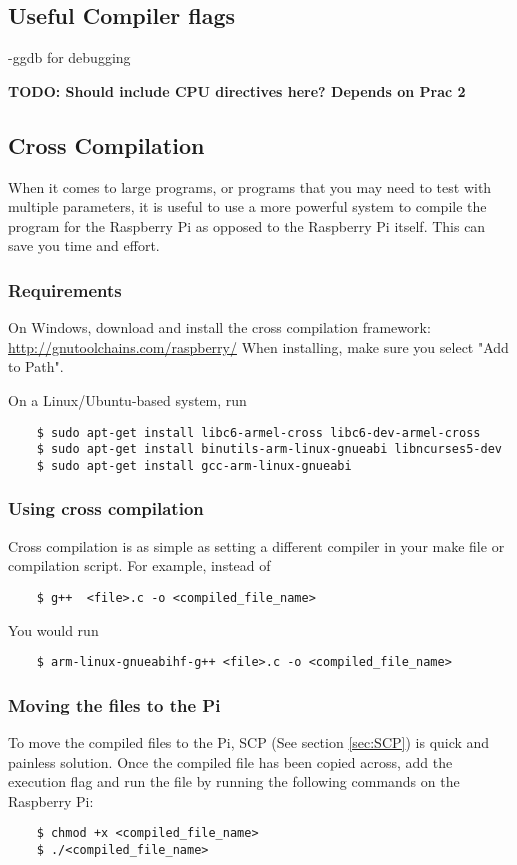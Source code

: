\subsection{Useful Compiler flags}
-ggdb for debugging

\textbf{TODO: Should include CPU directives here? Depends on Prac 2}


\subsection{Cross Compilation}
When it comes to large programs, or programs that you may need to test with multiple parameters, it is useful to use a more powerful system to compile the program for the Raspberry Pi as opposed to the Raspberry Pi itself. This can save you time and effort.

\subsubsection{Requirements}
On Windows, download and install the cross compilation framework: \newline
\href{http://gnutoolchains.com/raspberry/}{ http://gnutoolchains.com/raspberry/} \newline
When installing, make sure you select "Add to Path".

On a Linux/Ubuntu-based system, run
\begin{verbatim}
    $ sudo apt-get install libc6-armel-cross libc6-dev-armel-cross 
    $ sudo apt-get install binutils-arm-linux-gnueabi libncurses5-dev
    $ sudo apt-get install gcc-arm-linux-gnueabi
\end{verbatim}

\subsubsection{Using cross compilation}
Cross compilation is as simple as setting a different compiler in your make file or compilation script.
For example, instead of 
\begin{verbatim}
    $ g++  <file>.c -o <compiled_file_name>
\end{verbatim}
You would run
\begin{verbatim}
    $ arm-linux-gnueabihf-g++ <file>.c -o <compiled_file_name>
\end{verbatim}

\subsubsection{Moving the files to the Pi}
To move the compiled files to the Pi, SCP (See section \ref{sec:SCP}) is quick and painless solution. 
Once the compiled file has been copied across, add the execution flag and run the file by running the following commands on the Raspberry Pi:
\begin{verbatim}
    $ chmod +x <compiled_file_name>
    $ ./<compiled_file_name>
\end{verbatim}
